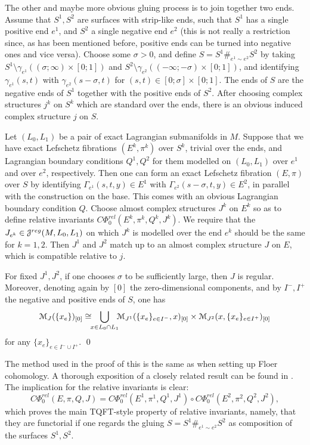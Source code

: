 \documentclass[10pt,letterpaper]{article}
\begin{document}
The other and maybe more obvious gluing process is to join together two ends.
Assume that $S^1,S^2$ are surfaces with strip-like ends, such that $S^1$ has a
single positive end $e^1$, and $S^2$ a single negative end $e^2$ (this is not
really a restriction since, as has been mentioned before, positive ends can be
turned into negative ones and vice versa). Choose some $\sigma>0$, and define
$S = S^1 \#_{e^1 \sim e^2} S^2$ by taking $S^1 \setminus
\gamma_{e^1}((\sigma;\infty) \times [0;1])$ and $S^2 \setminus
\gamma_{e^2}((-\infty;-\sigma) \times [0;1])$, and identifying
$\gamma_{e^1}(s,t)$ with $\gamma_{e^2}(s-\sigma,t)$ for $(s,t) \in [0;\sigma]
\times [0;1]$. The ends of $S$ are the negative ends of $S^1$ together with the
positive ends of $S^2$. After choosing complex structures $j^k$ on $S^k$ which
are standard over the ends, there is an obvious induced complex structure $j$
on $S$.

Let $(L_0,L_1)$ be a pair of exact Lagrangian submanifolds in $M$. Suppose that
we have exact Lefschetz fibrations $(E^k,\pi^k)$ over $S^k$, trivial over the
ends, and Lagrangian boundary conditions $Q^1,Q^2$ for them modelled on
$(L_0,L_1)$ over $e^1$ and over $e^2$, respectively. Then one can form an exact
Lefschetz fibration $(E,\pi)$ over $S$ by identifying $\Gamma_{e^1}(s,t,y) \in
E^1$ with $\Gamma_{e^2}(s-\sigma,t,y) \in E^2$, in parallel with the
construction on the base. This comes with an obvious Lagrangian boundary
condition $Q$. Choose almost complex structures $J^k$ on $E^k$ so as to define
relative invariants $C\Phi_0^{rel}(E^k,\pi^k,Q^k,J^k)$. We require that the
$J_{e^k} \in \mathcal{J}^{reg}(M,L_0,L_1)$ on which $J^k$ is modelled over the end $e^k$
should be the same for $k = 1,2$. Then $J^1$ and $J^2$ match up to an almost
complex structure $J$ on $E$, which is compatible relative to $j$.

\begin{prop} \label{th:gluing-ends}
For fixed $J^1,J^2$, if one chooses $\sigma$ to be sufficiently large, then $J$
is regular. Moreover, denoting again by $[0]$ the zero-dimensional components,
and by $I^-,I^+$ the negative and positive ends of $S$, one has
\[
\mathcal{M}_J(\{x_e\})_{[0]} \cong \bigcup_{\!\!\! x \in L_0 \cap L_1 \!\!\!}
\mathcal{M}_{J^1}(\{x_e\}_{e \in I^-},x)_{[0]} \times \mathcal{M}_{J^2}(x,\{x_e\}_{e \in
I^+})_{[0]}
\]
for any $\{x_e\}_{e \in I^- \cup I^+}$. \qed
\end{prop}

The method used in the proof of this is the same as when setting up Floer
cohomology. A thorough exposition of a closely related result can be found in
\cite[Section 4.4]{schwarz95}. The implication for the relative invariants is
clear:
\begin{equation} \label{eq:chain-composition}
 C\Phi_0^{rel}(E,\pi,Q,J) = C\Phi_0^{rel}(E^1,\pi^1,Q^1,J^1) \circ
 C\Phi_0^{rel}(E^2,\pi^2,Q^2,J^2),
\end{equation}
which proves the main TQFT-style property of relative invariants, namely, that
they are functorial if one regards the gluing $S = S^1 \#_{e^1 \sim e^2} S^2$
as composition of the surfaces $S^1,S^2$.
\end{document}

